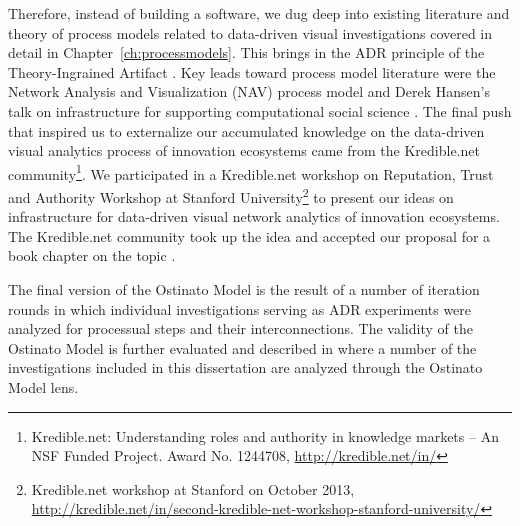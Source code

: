 Therefore, instead of building a software, we dug deep into existing literature and theory of process models related to data-driven visual investigations covered in detail in Chapter~\ref{ch:processmodels}. This brings in the ADR principle of the Theory-Ingrained Artifact \citep{Sein2011ActionResearch}. Key leads toward process model literature were the Network Analysis and Visualization (NAV) process model \citep{Hansen2012DoData} and Derek Hansen's talk on infrastructure for supporting computational social science \citep{Hansen2013InfrastructureScience}. The final push that inspired us to externalize our accumulated knowledge on the data-driven visual analytics process of innovation ecosystems came from the Kredible.net community\footnote{Kredible.net: Understanding roles and authority in knowledge markets – An NSF Funded Project. Award No. 1244708, \url{http://kredible.net/in/}}. We participated in a Kredible.net workshop on Reputation, Trust and Authority Workshop at Stanford University\footnote{Kredible.net workshop at Stanford on October 2013, \url{http://kredible.net/in/second-kredible-net-workshop-stanford-university/}} to present our ideas on infrastructure for data-driven visual network analytics of innovation ecosystems. The Kredible.net community took up the idea and accepted our proposal for a book chapter on the topic \citep{Huhtamaki2015Ostinato:Analytics}.

The final version of the Ostinato Model is the result of a number of iteration rounds in which individual investigations serving as ADR experiments were analyzed for processual steps and their interconnections. The validity of the Ostinato Model is further evaluated and described in \cite{Huhtamaki2017ProcessingExperiences} where a number of the investigations included in this dissertation are analyzed through the Ostinato Model lens.



